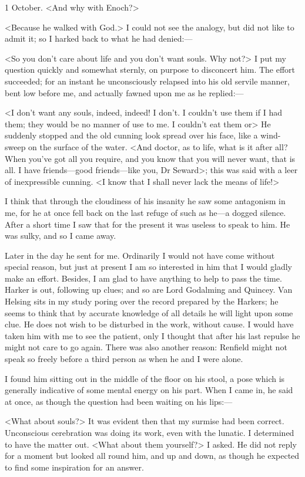 \begin{diary}{1 October.}
<And why with Enoch?>

<Because he walked with God.> I could not see the analogy, but did not like to admit it; so I harked back to what he had denied:—

<So you don't care about life and you don't want souls. Why not?> I put my question quickly and somewhat sternly, on purpose to disconcert him. The effort succeeded; for an instant he unconsciously relapsed into his old servile manner, bent low before me, and actually fawned upon me as he replied:—

<I don't want any souls, indeed, indeed! I don't. I couldn't use them if I had them; they would be no manner of use to me. I couldn't eat them or\longdash> He suddenly stopped and the old cunning look spread over his face, like a wind-sweep on the surface of the water. <And doctor, as to life, what is it after all? When you've got all you require, and you know that you will never want, that is all. I have friends—good friends—like you, Dr Seward>; this was said with a leer of inexpressible cunning. <I know that I shall never lack the means of life!>

I think that through the cloudiness of his insanity he saw some antagonism in me, for he at once fell back on the last refuge of such as he—a dogged silence. After a short time I saw that for the present it was useless to speak to him. He was sulky, and so I came away.

Later in the day he sent for me. Ordinarily I would not have come without special reason, but just at present I am so interested in him that I would gladly make an effort. Besides, I am glad to have anything to help to pass the time. Harker is out, following up clues; and so are Lord Godalming and Quincey. Van Helsing sits in my study poring over the record prepared by the Harkers; he seems to think that by accurate knowledge of all details he will light upon some clue. He does not wish to be disturbed in the work, without cause. I would have taken him with me to see the patient, only I thought that after his last repulse he might not care to go again. There was also another reason: Renfield might not speak so freely before a third person as when he and I were alone.

I found him sitting out in the middle of the floor on his stool, a pose which is generally indicative of some mental energy on his part. When I came in, he said at once, as though the question had been waiting on his lips:—

<What about souls?> It was evident then that my surmise had been correct. Unconscious cerebration was doing its work, even with the lunatic. I determined to have the matter out. <What about them yourself?> I asked. He did not reply for a moment but looked all round him, and up and down, as though he expected to find some inspiration for an answer.


\end{diary}
